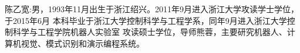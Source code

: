 \begin{resume}
陈乙宽:男，1993年11月出生于浙江绍兴。2011年9月进入浙江大学攻读学士学位，于2015年6月 本科毕业于浙江大学控制科学与工程学系，同年9月进入浙江大学控制科学与工程学院机器人实验室 攻读硕士学位，导师熊蓉，主要研究机器人、计算机视觉、模式识别和演示编程系统。
\end{resume}
